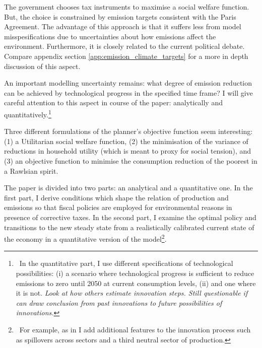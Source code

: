 The government chooses tax instruments to maximise a 
social welfare function. But, the choice is constrained by emission targets consistent with the Paris Agreement. The advantage of this approach is that it suffers less from  model misspesifications due to  uncertainties about how emissions affect the environment. Furthermore, it is closely related to the current political debate. Compare appendix section \ref{app:emission_climate_targets} for a more in depth discussion of this aspect.  


An important modelling uncertainty remains: what degree of emission reduction can be achieved by technological progress in the specified time frame? I will give careful attention to this aspect in course of the paper: analytically and quantitatively.\footnote{\ In the quantitative part, I use different specifications of technological possibilities: (i) a scenario where technological progress is sufficient to reduce emissions to zero until 2050 at current consumption levels, (ii) and one where it is not. \textit{ Look at how others estimate innovation steps. Still questionable if can draw conclusion from past innovations to future possibilities of innovations. }}


Three different formulations of the planner's objective function seem interesting: (1) a Utilitarian social welfare function, (2) the minimisation of the variance of reductions in household utility (which is meant to proxy for social tension), and (3) an objective function to minimise the consumption reduction of the poorest in a Rawlsian spirit. 


The paper is divided into two parts: an analytical and a quantitative one.
In the first part, I derive  conditions which shape the relation of production and emissions so that fiscal policies are employed for environmental reasons in presence  of corrective taxes.  
In the second part, I examine the optimal policy and transitions to the new steady state from a realistically calibrated current state of the economy in a quantitative version of the model\footnote{\ For example, as in  \cite{Fried2018ClimateAnalysis} I add additional features to the innovation process such as spillovers across sectors and a third neutral sector of production.}.

